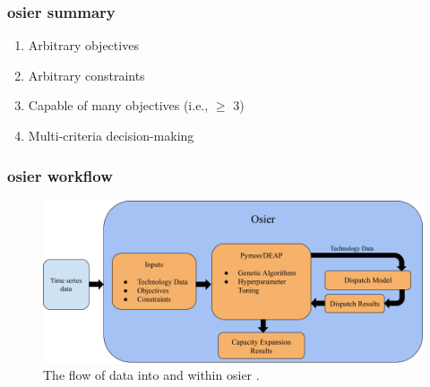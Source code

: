 \begin{frame}
    \frametitle{\Gls{osier} summary}
    \begin{enumerate}
        \item Arbitrary objectives
        \item Arbitrary constraints
        \item Capable of many objectives (i.e., $\geq$ 3)
        \item Multi-criteria decision-making
    \end{enumerate}
\end{frame}

\begin{frame}
    \frametitle{\Gls{osier} workflow}
    \begin{figure}[htbp!]
    \centering
    \includegraphics[width=\columnwidth]{figures/osier_flow}
    \caption{The flow of data into and within \Gls{osier} \cite{dotson_osier_2024}.}
    \label{fig:osier_flow}
\end{figure}
\end{frame}